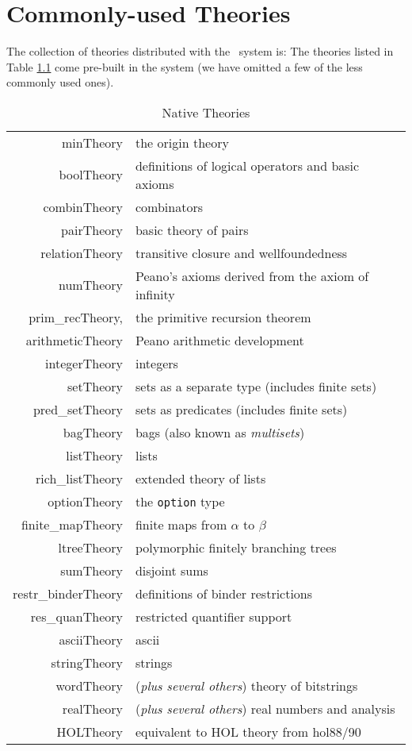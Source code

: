 \chapter{Commonly-used Theories}\label{HOLtheories}

The collection of theories distributed with the \HOL\ system
is:
The theories listed in Table \ref{nativeTheories} come
pre-built in the system (we have omitted a few of the less commonly used
ones).
\begin{table}
\begin{center}
\begin{tabular}{|r|l|} \hline
minTheory & the origin theory \\
boolTheory & definitions of logical operators and basic axioms \\
combinTheory & combinators \\
pairTheory & basic theory of pairs \\
relationTheory & transitive closure and wellfoundedness \\
numTheory & Peano's axioms derived from the axiom of infinity \\
prim\_recTheory, & the primitive recursion theorem \\
arithmeticTheory & Peano arithmetic development \\
integerTheory & integers \\
setTheory & sets as a separate type (includes finite sets) \\
pred\_setTheory & sets as predicates (includes finite sets) \\
bagTheory & bags (also known as \emph{multisets})\\
listTheory & lists  \\
rich\_listTheory & extended theory of lists \\
optionTheory & the {\tt option} type \\
finite\_mapTheory & finite maps from $\alpha$ to $\beta$ \\
ltreeTheory & polymorphic finitely branching trees \\
sumTheory & disjoint sums \\
restr\_binderTheory & definitions of binder restrictions \\
res\_quanTheory & restricted quantifier support \\
asciiTheory & ascii \\
stringTheory & strings \\
wordTheory & ({\it plus several others}) theory of bitstrings \\
realTheory & ({\it plus several others}) real numbers and analysis \\
HOLTheory & equivalent to HOL theory from hol88/90\\  \hline
\end{tabular}
\caption{Native Theories}\label{nativeTheories}
\end{center}
\end{table}

